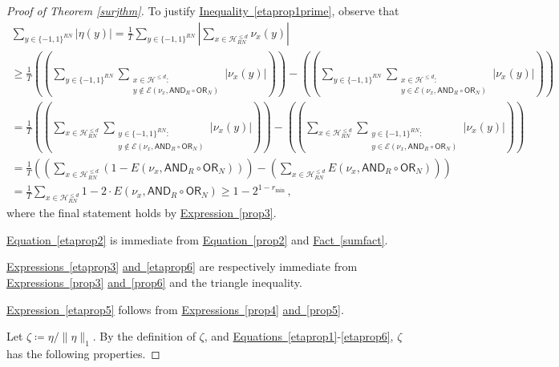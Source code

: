 \documentclass[11pt]{article}
\numberwithin{equation}{section}
\theoremstyle{definition}
\theoremstyle{plain}
\newcommand{\expref}[2]{\hyperref[#2]{#1~\ref{#2}}}
\newcommand{\expeqref}[2]{\hyperref[#2]{#1~\eqref{#2}}}
\newcommand{\OR}{\mathsf{ OR}}
\newcommand{\bits}{\{-1,1\}}
\newcommand{\Hcal}{\mathcal{H}}
\newcommand{\AND}{\mathsf{AND}}
\begin{document}
\begin{proof}[Proof of Theorem \ref{surjthm}]
	To justify \expeqref{Inequality}{etaprop1prime}, observe that 
	\begin{align*}
	\sum_{y \in \bits^{RN}} |\eta(y)| = \frac1T \sum_{y \in \bits^{RN}} \left|\sum_{x \in \Hcal^{\leq d}_{RN}}  \nu_x(y)\right| \\
	\geq \frac1T \left( \left(\sum_{y \in \bits^{RN}} \sum_{\substack{x \in \Hcal^{\leq d} \colon\\ y \not \in \mathcal{E}(\nu_x, \AND_R \circ \OR_N)}} \left|\nu_x(y)\right|\right)\right)
	-  \left( \left(\sum_{y \in \bits^{RN}} \sum_{\substack{x \in \Hcal^{\leq d} \colon\\ y \in \mathcal{E}(\nu_x, \AND_R \circ \OR_N)}}  |\nu_x(y)|\right)\right)\\
	= \frac1T \left( \left(\sum_{x \in \Hcal^{\leq d}_{RN}} \sum_{\substack{y \in \bits^{RN} \colon \\ y \not \in \mathcal{E}(\nu_x, \AND_R \circ \OR_N)}} \left|\nu_x(y)\right|\right)\right)
	-  \left( \left(\sum_{x \in \Hcal^{\leq d}_{RN}}  \sum_{\substack{y \in \bits^{RN} \colon\\ y \in \mathcal{E}(\nu_x, \AND_R \circ \OR_N)}} \left|\nu_x(y)\right|\right)\right)\\
	= \frac1T \left( \left(\sum_{x \in \Hcal^{\leq d}_{RN}} \left(1-E\left(\nu_x, \AND_R \circ \OR_N\right)\right)\right) - \left( \sum_{x \in \Hcal^{\leq d}_{RN}} E\left(\nu_x, \AND_R \circ \OR_N\right)\right)\right)\\
	=  \frac1T \sum_{x \in \Hcal^{\leq d}_{RN}} 1-2 \cdot E\left(\nu_x, \AND_R \circ \OR_N\right) \geq 1-2^{1-r_{\text{min}}}\,,
	\end{align*}
where the final statement holds by \expeqref{Expression}{prop3}.
	
	\expeqref{Equation}{etaprop2} is immediate from \expeqref{Equation}{prop2} and \expref{Fact}{sumfact}.
	
	\expeqref{Expressions}{etaprop3} \expeqref{and}{etaprop6} are respectively immediate from \expeqref{Expressions}{prop3} \expeqref{and}{prop6} and the triangle inequality.
	
	\expeqref{Expression}{etaprop5} follows from \expeqref{Expressions}{prop4} \expeqref{and}{prop5}.
	
	\medskip
	Let $\zeta \coloneqq  \eta/\|\eta\|_1$. By the definition of $\zeta$, and \expeqref{Equations}{etaprop1}-\eqref{etaprop6}, $\zeta$ has the following properties. %
	

\end{proof}
\end{document}
